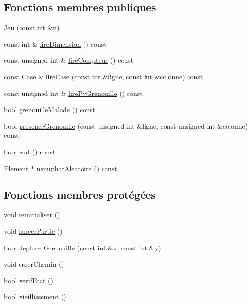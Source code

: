 \subsection*{Fonctions membres publiques}
\begin{DoxyCompactItemize}
\item 
\hyperlink{classgrenouilloland_1_1Jeu_aa17e547858c8e5d805c630dd52709599}{Jeu} (const int \&n)
\item 
const int \& \hyperlink{classgrenouilloland_1_1Jeu_ad0212b9c81ad43fa588275b5352e2f10}{lire\-Dimension} () const 
\item 
const unsigned int \& \hyperlink{classgrenouilloland_1_1Jeu_aaf16fe8116cec0e81936c4afbbaf9d9b}{lire\-Compteur} () const 
\item 
const \hyperlink{classgrenouilloland_1_1Case}{Case} \& \hyperlink{classgrenouilloland_1_1Jeu_a86292514d1a52166e63b54f09992ce93}{lire\-Case} (const int \&ligne, const int \&colonne) const 
\item 
const unsigned int \& \hyperlink{classgrenouilloland_1_1Jeu_ad3e1ac4ffca6a1f360de9d3dae2f02f6}{lire\-Pv\-Grenouille} () const 
\item 
bool \hyperlink{classgrenouilloland_1_1Jeu_a6317f289086e77fed2c4555c38fa86af}{grenouille\-Malade} () const 
\item 
bool \hyperlink{classgrenouilloland_1_1Jeu_a3a90f0bd8b1dd81ee311fd20b2c3df31}{presence\-Grenouille} (const unsigned int \&ligne, const unsigned int \&colonne) const 
\item 
bool \hyperlink{classgrenouilloland_1_1Jeu_aa95a6941d6b5fe55fe775824dfe7c1b7}{end} () const 
\item 
\hyperlink{classgrenouilloland_1_1Element}{Element} $\ast$ \hyperlink{classgrenouilloland_1_1Jeu_a0bee5ac205c6fa11f71e237f2d1b8a02}{nenuphar\-Aleatoire} () const 
\end{DoxyCompactItemize}
\subsection*{Fonctions membres protégées}
\begin{DoxyCompactItemize}
\item 
void \hyperlink{classgrenouilloland_1_1Jeu_ab07fc3cd7186b844201d3e7639dcdf37}{reinitialiser} ()
\item 
void \hyperlink{classgrenouilloland_1_1Jeu_a98de76a91961f5c12bb1df678484dafa}{lancer\-Partie} ()
\item 
bool \hyperlink{classgrenouilloland_1_1Jeu_aec511079bde27f924e47db40239bf2f4}{deplacer\-Grenouille} (const int \&x, const int \&y)
\item 
void \hyperlink{classgrenouilloland_1_1Jeu_aed1eb1f7ece1d95617d168f84827dacd}{creer\-Chemin} ()
\item 
bool \hyperlink{classgrenouilloland_1_1Jeu_ae64660044f52c37b9283ed9538cc02df}{verif\-Etat} ()
\item 
bool \hyperlink{classgrenouilloland_1_1Jeu_a4052316bd896fdf6dbec94e03a3ad7aa}{vieillissement} ()
\end{DoxyCompactItemize}
